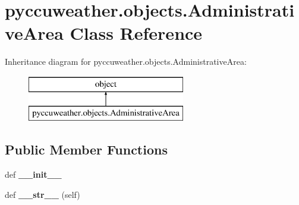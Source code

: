 \hypertarget{classpyccuweather_1_1objects_1_1_administrative_area}{}\section{pyccuweather.\+objects.\+Administrative\+Area Class Reference}
\label{classpyccuweather_1_1objects_1_1_administrative_area}
Inheritance diagram for pyccuweather.\+objects.\+Administrative\+Area\+:\begin{figure}[H]
\begin{center}
\leavevmode
\includegraphics[height=2.000000cm]{classpyccuweather_1_1objects_1_1_administrative_area}
\end{center}
\end{figure}
\subsection*{Public Member Functions}
\begin{DoxyCompactItemize}
\item 
\hypertarget{classpyccuweather_1_1objects_1_1_administrative_area_a40ce4cc3d820f593039493c821a9b959}{}def {\bfseries \+\_\+\+\_\+init\+\_\+\+\_\+}\label{classpyccuweather_1_1objects_1_1_administrative_area_a40ce4cc3d820f593039493c821a9b959}

\item 
\hypertarget{classpyccuweather_1_1objects_1_1_administrative_area_ab0451305c0002cc06e8ebab5c04d75fe}{}def {\bfseries \+\_\+\+\_\+str\+\_\+\+\_\+} (self)\label{classpyccuweather_1_1objects_1_1_administrative_area_ab0451305c0002cc06e8ebab5c04d75fe}

\end{DoxyCompactItemize}
